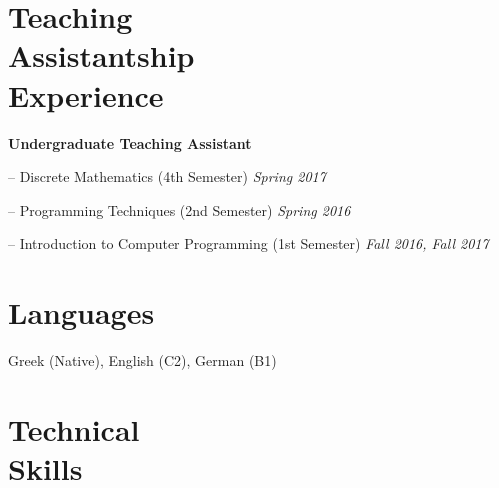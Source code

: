 \documentclass[margin]{res}
\begin{document}
\begin{resume}
\section{Teaching \\ Assistantship \\ Experience} 
\textbf{Undergraduate Teaching Assistant}
\begin{compactitem}
    \item[--] Discrete Mathematics (4th Semester) \hfill \emph{Spring 2017}
    \item[--] Programming Techniques (2nd Semester) \hfill \emph{Spring 2016}
    \item[--] Introduction to Computer Programming (1st Semester) \hfill \emph{Fall 2016, Fall 2017}
\end{compactitem}



\section{Languages} Greek (Native), English (C2), German (B1)


\begin{comment}
\section{Data \\ Analysis \& \\ Visualization \\ Tools} 
\begin{compactitem}
\item[--] Python 
\item[--] Bash 
\item[--] MATLAB 
\item[--] GNU Octave 
\item[--] R
\item[--] Matplotlib 
\item[--] GNUPlot 
\item[--] Pandas
\item[--] Seaborn
\item[--] MySQL 
\item[--] MongoDB 
\end{compactitem}
\end{comment}

\section{Technical \\ Skills}


\end{resume}
\end{document}
